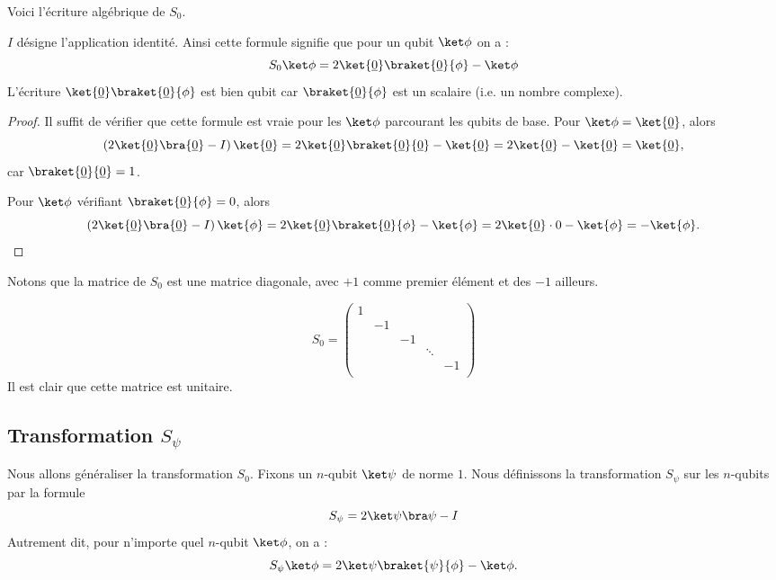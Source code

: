 \documentclass[11pt,class=report,crop=false]{standalone}
\begin{document}
Voici l'écriture algébrique de $S_0$.
\begin{lemme}
\sauteligne
\end{lemme}
$I$ désigne l'application identité.
Ainsi cette formule signifie que pour un qubit $\ket\phi$ on a :
$$S_0\ket\phi = 2 \ket{\underline0} \braket{\underline0}{\phi} - \ket\phi$$
L'écriture $\ket{\underline0} \braket{\underline0}{\phi}$ est bien qubit car $\braket{\underline0}{\phi}$ est un scalaire (i.e. un nombre complexe).

\begin{proof}
Il suffit de vérifier que cette formule est vraie pour les $\ket\phi$ parcourant les qubits de base.
Pour $\ket\phi = \ket{\underline0}$, alors 
$$\left(2 \ket{\underline0}\bra{\underline0} - I\right)	\ket{\underline0}
= 2 \ket{\underline0}\braket{\underline0}{\underline0} -	\ket{\underline0}
= 2 \ket{\underline0} - \ket{\underline0} = \ket{\underline0},$$
car $\braket{\underline0}{\underline0} = 1$.

Pour $\ket\phi$ vérifiant $\braket{\underline0}{\phi} = 0$, alors 
$$\left(2 \ket{\underline0}\bra{\underline0} - I\right)	\ket{\phi}
= 2 \ket{\underline0}\braket{\underline0}{\phi} -	\ket{\phi}
= 2 \ket{\underline0} \cdot0 - \ket{\phi} = -\ket{\phi}.$$
\end{proof} 

Notons que la matrice de $S_0$ est une matrice diagonale, avec $+1$ comme premier élément et des $-1$ ailleurs.

$$S_0=\begin{pmatrix}
1&  &  &      &  \\
 &-1&  &      &  \\
 &  &-1&      &  \\
 &  &  &\ddots&  \\
 &  &  &      &-1\\
\end{pmatrix}$$
Il est clair que cette matrice est unitaire.
	
\subsection{Transformation $S_\psi$}

Nous allons généraliser la transformation $S_0$.
Fixons un $n$-qubit $\ket\psi$ de norme $1$.
Nous définissons la transformation $S_\psi$ sur les $n$-qubits par la formule 
$$S_\psi = 2 \ket\psi \bra\psi - I$$
Autrement dit, pour n'importe quel $n$-qubit $\ket\phi$, on a :
$$S_\psi \ket\phi = 2 \ket\psi \braket{\psi}{\phi} - \ket\phi.$$
\end{document}
